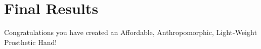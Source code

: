 \section{Final Results}

{\large Congratulations you have created an Affordable, Anthropomorphic, Light-Weight Prosthetic Hand!}

\vspace{1in}

\begin{center}
\end{center} 
		